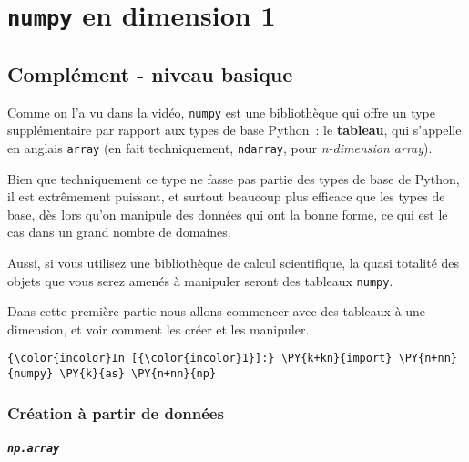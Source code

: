     
    
    
    

    

    \hypertarget{numpy-en-dimension-1}{%
\section{\texorpdfstring{\texttt{numpy} en dimension
1}{numpy en dimension 1}}\label{numpy-en-dimension-1}}

    \hypertarget{compluxe9ment---niveau-basique}{%
\subsection{Complément - niveau
basique}\label{compluxe9ment---niveau-basique}}

    Comme on l'a vu dans la vidéo, \texttt{numpy} est une bibliothèque qui
offre un type supplémentaire par rapport aux types de base Python~: le
\textbf{tableau}, qui s'appelle en anglais \texttt{array} (en fait
techniquement, \texttt{ndarray}, pour \emph{n-dimension array}).

Bien que techniquement ce type ne fasse pas partie des types de base de
Python, il est extrêmement puissant, et surtout beaucoup plus efficace
que les types de base, dès lors qu'on manipule des données qui ont la
bonne forme, ce qui est le cas dans un grand nombre de domaines.

Aussi, si vous utilisez une bibliothèque de calcul scientifique, la
quasi totalité des objets que vous serez amenés à manipuler seront des
tableaux \texttt{numpy}.

    Dans cette première partie nous allons commencer avec des tableaux à une
dimension, et voir comment les créer et les manipuler.

    \begin{Verbatim}[commandchars=\\\{\},frame=single,framerule=0.3mm,rulecolor=\color{cellframecolor}]
{\color{incolor}In [{\color{incolor}1}]:} \PY{k+kn}{import} \PY{n+nn}{numpy} \PY{k}{as} \PY{n+nn}{np}
\end{Verbatim}


    \hypertarget{cruxe9ation-uxe0-partir-de-donnuxe9es}{%
\subsubsection{Création à partir de
données}\label{cruxe9ation-uxe0-partir-de-donnuxe9es}}

    \hypertarget{np.array}{%
\subparagraph{\texorpdfstring{\texttt{np.array}}{np.array}}\label{np.array}}

